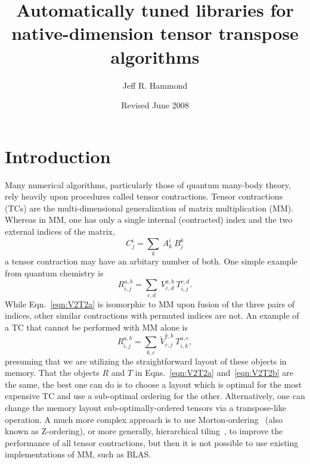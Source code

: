 \documentclass[aps,preprint,groupedaddress]{revtex4-1}
\begin{document}
\title{Automatically tuned libraries for native-dimension tensor transpose algorithms}

\author{Jeff R. Hammond}


\date{Revised June 2008}%

\begin{abstract}



\end{abstract}

\maketitle

\section{Introduction}

Many numerical algorithms, particularly those of quantum many-body theory, rely heavily upon procedures called tensor contractions.  Tensor contractions (TCs) are the multi-dimensional generalization of matrix multiplication (MM).  Whereas in MM, one has only a single internal (contracted) index and the two external indices of the matrix,
\begin{equation}
 C^{i}_{j} = \sum_{k}~A^{i}_{k}~B^{k}_{j}
\end{equation}
a tensor contraction may have an arbitary number of both.  One simple example from quantum chemistry is
\begin{equation}\label{eqn:V2T2a}
 R^{a,b}_{i,j} = \sum_{c,d}~V^{a,b}_{c,d}~T^{c,d}_{i,j}.
\end{equation}
While Eqn.~\ref{eqn:V2T2a} is isomorphic to MM upon fusion of the three pairs of indices, other similar contractions with permuted indices are not.  An example of a TC that cannot be performed with MM alone is
\begin{equation}\label{eqn:V2T2b}
 R^{a,b}_{i,j} = \sum_{k,c}~\tilde{V}^{k,b}_{c,j}~T^{a,c}_{i,k},
\end{equation}
presuming that we are utilizing the straightforward layout of these objects in memory.  That the objects $R$ and $T$ in Eqns.~\ref{eqn:V2T2a} and~\ref{eqn:V2T2b} are the same, the best one can do is to choose a layout which is optimal for the most expensive TC and use a sub-optimal ordering for the other.  Alternatively, one can change the memory layout sub-optimally-ordered tensors via a transpose-like operation.  A much more complex approach is to use Morton-ordering~\cite{Morton} (also known as Z-ordering), or more generally, hierarchical tiling~\cite{HTiling}, to improve the performance of all tensor contractions, but then it is not possible to use existing implementations of MM, such as BLAS.
\end{document}
